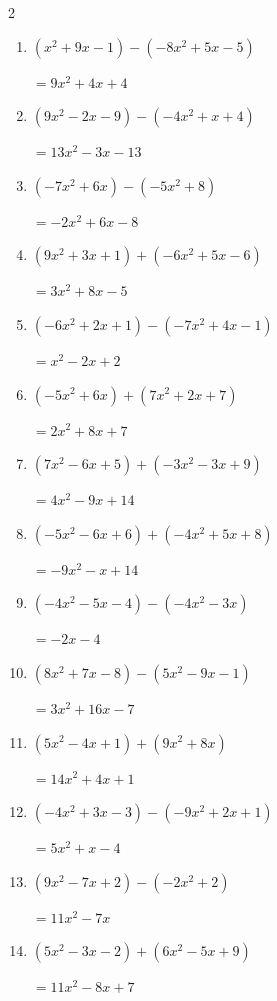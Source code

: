 \begin{multicols}{2}
\begin{enumerate}
        $=-x^{2}+16x-7$

  \item $(x^{2}+9x-1)-(-8x^{2}+5x-5)$

        $=9x^{2}+4x+4$

  \item $(9x^{2}-2x-9)-(-4x^{2}+x+4)$

        $=13x^{2}-3x-13$

  \item $(-7x^{2}+6x)-(-5x^{2}+8)$

        $=-2x^{2}+6x-8$

  \item $(9x^{2}+3x+1)+(-6x^{2}+5x-6)$

        $=3x^{2}+8x-5$

  \item $(-6x^{2}+2x+1)-(-7x^{2}+4x-1)$

        $=x^{2}-2x+2$

  \item $(-5x^{2}+6x)+(7x^{2}+2x+7)$

        $=2x^{2}+8x+7$

  \item $(7x^{2}-6x+5)+(-3x^{2}-3x+9)$

        $=4x^{2}-9x+14$

  \item $(-5x^{2}-6x+6)+(-4x^{2}+5x+8)$

        $=-9x^{2}-x+14$

  \item $(-4x^{2}-5x-4)-(-4x^{2}-3x)$

        $=-2x-4$

  \item $(8x^{2}+7x-8)-(5x^{2}-9x-1)$

        $=3x^{2}+16x-7$

  \item $(5x^{2}-4x+1)+(9x^{2}+8x)$

        $=14x^{2}+4x+1$

  \item $(-4x^{2}+3x-3)-(-9x^{2}+2x+1)$

        $=5x^{2}+x-4$

  \item $(9x^{2}-7x+2)-(-2x^{2}+2)$

        $=11x^{2}-7x$

  \item $(5x^{2}-3x-2)+(6x^{2}-5x+9)$

        $=11x^{2}-8x+7$


\end{enumerate}
\end{multicols}
